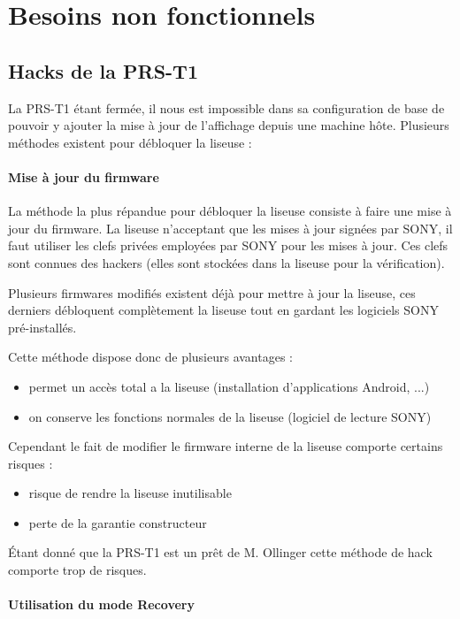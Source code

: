 \chapter{Besoins non fonctionnels}
\section{Hacks de la PRS-T1}

La PRS-T1 étant fermée, il nous est impossible dans sa configuration de base de pouvoir y ajouter la mise à jour 
de l'affichage depuis une machine hôte.
Plusieurs méthodes existent pour débloquer la liseuse : 

\subsubsection{Mise à jour du firmware}

La méthode la plus répandue pour débloquer la liseuse consiste à faire une mise à jour du firmware.
La liseuse n'acceptant que les mises à jour signées par SONY, il faut utiliser les clefs privées employées par SONY pour les mises à jour. Ces clefs sont connues des hackers (elles sont stockées dans la liseuse pour la vérification).

Plusieurs firmwares modifiés existent déjà pour mettre à jour la liseuse, ces derniers débloquent complètement la liseuse tout en gardant les logiciels SONY pré-installés.

Cette méthode dispose donc de plusieurs avantages : 
	\begin{itemize}
		\item permet un accès total a la liseuse (installation d'applications Android, ...)
		\item on conserve les fonctions normales de la liseuse (logiciel de lecture SONY)
	\end{itemize}
Cependant le fait de modifier le firmware interne de la liseuse comporte certains risques : 
	\begin{itemize}
		\item risque de rendre la liseuse inutilisable
		\item perte de la garantie constructeur
	\end{itemize}

Étant donné que la PRS-T1 est un prêt de M. Ollinger cette méthode de hack comporte trop de risques.

\subsubsection{Utilisation du mode Recovery}

